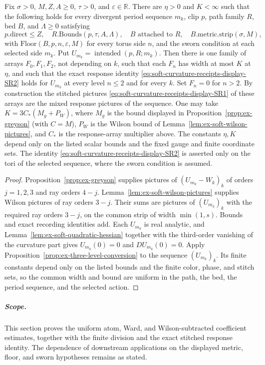 \begin{theorem}
\label{thm:ex-soft-response-mockups}
Fix $\sigma>0$, $M,Z,A\geq0$, $\tau>0$, and $\varepsilon\in\mathbb R$.
There are $\eta>0$ and $K<\infty$ such that the following holds for
every divergent period sequence $m_k$, clip $p$, path family $R$, bed
$B$, and $\Lambda\geq0$ satisfying
\[
 p.\mathrm{direct}\leq Z,\quad R.\mathrm{Bounds}(p,\tau,A,\Lambda),\quad
 B\text{ attached to }R,\quad B.\mathrm{metric.strip}(\sigma,M),
\]
with $\mathrm{Floor}(B,p,n,\varepsilon,M)$ for every torus side $n$,
and the sworn condition at each selected side $m_k$. Put
$U_{m_k}=\operatorname{intended}(p,R;m_k)$. Then there is one family of
arrays $F_0,F_1,F_2$, not depending on $k$, such that each $F_n$ has
width at most $K$ at $\eta$, and such that the exact response identity
\eqref{eq:soft-curvature-receipts-display-SR2} holds for $U_{m_k}$ at every level $n\leq2$ and for every $k$.
Set $F_n=0$ for $n>2$. By construction the stitched pictures \eqref{eq:soft-curvature-receipts-display-SR1} of
these arrays are the mixed response pictures of the sequence. One may
take $K=3C_*(M_g+P_W)$, where $M_g$ is the bound displayed in
Proposition~\ref{prop:ex-greyson} (with $C=M$), $P_W$ is the Wilson
bound of Lemma~\ref{lem:ex-soft-wilson-pictures}, and $C_*$ is the
response-array multiplier above. The constants $\eta,K$ depend only on
the listed scalar bounds and the fixed gauge and finite coordinate
sets. The identity \eqref{eq:soft-curvature-receipts-display-SR2} is asserted only on the tori of the selected
sequence, where the sworn condition is assumed.
\end{theorem}

\begin{proof}
Proposition~\ref{prop:ex-greyson} supplies pictures of $(U_{m_k}-W_k)_k$
of orders $j=1,2,3$ and ray orders $4-j$.
Lemma~\ref{lem:ex-soft-wilson-pictures} supplies Wilson pictures of
ray orders $3-j$. Their sums are pictures of $(U_{m_k})_k$ with the
required ray orders $3-j$, on the common strip of width $\min(1,s)$.
Bounds and exact recording identities add. Each $U_{m_k}$ is real
analytic, and Lemma~\ref{lem:ex-soft-quadratic-hessian} together with
the third-order vanishing of the curvature part gives $U_{m_k}(0)=0$
and $DU_{m_k}(0)=0$. Apply
Proposition~\ref{prop:ex-three-level-conversion} to the sequence
$(U_{m_k})_k$. Its finite constants depend only on the listed bounds
and the finite color, phase, and stitch sets, so the common width and
bound are uniform in the path, the bed, the period sequence, and the
selected action.
\end{proof}

\subparagraph{Scope.}
This section proves the uniform atom, Ward, and Wilson-subtracted
coefficient estimates, together with the finite division and the exact
stitched response identity. The dependence of downstream applications on
the displayed metric, floor, and sworn hypotheses remains as stated.
